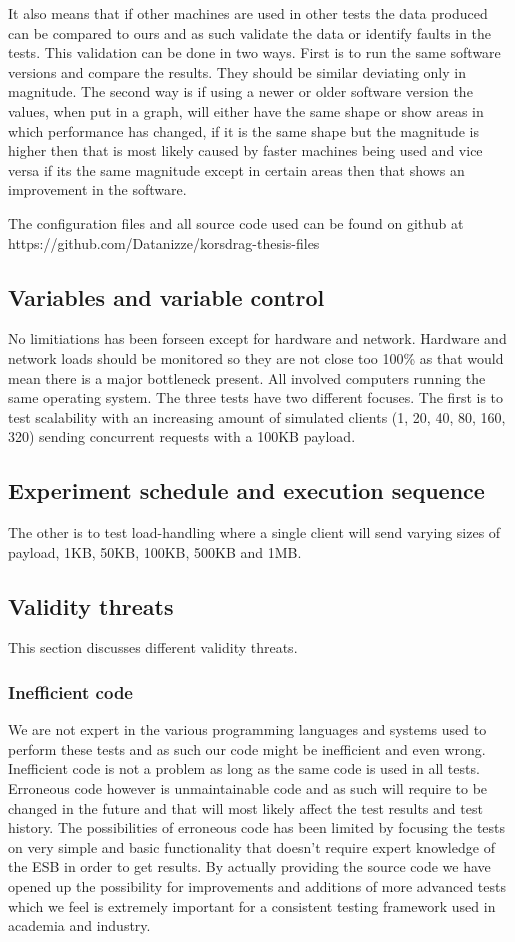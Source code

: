 It also means that if other machines are used in other tests the data produced can be compared to ours and as such validate the data or identify faults in the tests. 
This validation can be done in two ways. 
First is to run the same software versions and compare the results. 
They should be similar deviating only in magnitude. The second way is if using a newer or older software version the values, when put in a graph, will either have the same shape or show areas in which performance has changed, 
if it is the same shape but the magnitude is higher then that is most likely caused by faster machines being used and vice versa if its the same magnitude except in certain areas then that shows an improvement in the software.

The configuration files and all source code used can be found on github at https://github.com/Datanizze/korsdrag-thesis-files

\subsection{Variables and variable control}
No limitiations has been forseen except for hardware and network.
Hardware and network loads should be monitored so they are not close too 100\% as that would mean there is a major bottleneck present. 
All involved computers running the same operating system.
The three tests have two different focuses. The first is to test scalability with an increasing amount of simulated clients (1, 20, 40, 80, 160, 320) sending concurrent requests with a 100KB payload. 
\subsection{Experiment schedule and execution sequence}
The other is to test load-handling where a single client will send varying sizes of payload, 1KB, 50KB, 100KB, 500KB and 1MB.
\subsection{Validity threats}
This section discusses different validity threats.
\subsubsection{Inefficient code}
We are not expert in the various programming languages and systems used to perform these tests and as such our code might be inefficient and even wrong. Inefficient code is not a problem as long as the same code is used in all tests. Erroneous code however is unmaintainable code and as such will require to be changed in the future and that will most likely affect the test results and test history. 
The possibilities of erroneous code has been limited by focusing the tests on very simple and basic functionality that doesn't require expert knowledge of the ESB in order to get results.
By actually providing the source code we have opened up the possibility for improvements and additions of more advanced tests which we feel is extremely important for a consistent testing framework used in academia and industry.

